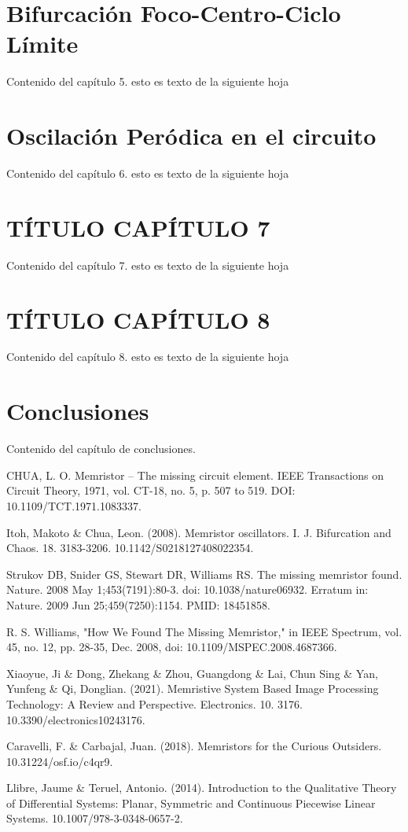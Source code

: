 \documentclass[12pt,a4paper]{report} %
\begin{document}
	\chapter{Bifurcación Foco-Centro-Ciclo Límite}
	Contenido del capítulo 5.
	\newpage
	esto es texto de la siguiente hoja
	
	\chapter{Oscilación Peródica en el circuito}
	Contenido del capítulo 6.
	\newpage
	esto es texto de la siguiente hoja
	
	\chapter{TÍTULO CAPÍTULO 7}
	Contenido del capítulo 7.
	\newpage
	esto es texto de la siguiente hoja
	
	\chapter{TÍTULO CAPÍTULO 8}
	Contenido del capítulo 8.
	\newpage
	esto es texto de la siguiente hoja
	
	\chapter*{Conclusiones}
	Contenido del capítulo de conclusiones.
	\newpage
	
	
	\begin{thebibliography}{99}
		 CHUA, L. O. Memristor – The missing circuit element. IEEE
		Transactions on Circuit Theory, 1971, vol. CT-18, no. 5, p. 507 to
		519. DOI: 10.1109/TCT.1971.1083337.
		
		 Itoh, Makoto \& Chua, Leon. (2008). Memristor oscillators. I. J. Bifurcation and Chaos. 18. 3183-3206. 10.1142/S0218127408022354. 
		
		 Strukov DB, Snider GS, Stewart DR, Williams RS. The missing memristor found. Nature. 2008 May 1;453(7191):80-3. doi: 10.1038/nature06932. Erratum in: Nature. 2009 Jun 25;459(7250):1154. PMID: 18451858.
		
		 R. S. Williams, "How We Found The Missing Memristor," in IEEE Spectrum, vol. 45, no. 12, pp. 28-35, Dec. 2008, doi: 10.1109/MSPEC.2008.4687366.
		
		 Xiaoyue, Ji \& Dong, Zhekang \& Zhou, Guangdong \& Lai, Chun Sing \& Yan, Yunfeng \& Qi, Donglian. (2021). Memristive System Based Image Processing Technology: A Review and Perspective. Electronics. 10. 3176. 10.3390/electronics10243176. 
		
		 Caravelli, F. \& Carbajal, Juan. (2018). Memristors for the Curious Outsiders. 10.31224/osf.io/c4qr9. 
		
		 Llibre, Jaume \& Teruel, Antonio. (2014). Introduction to the Qualitative Theory of Differential Systems: Planar, Symmetric and Continuous Piecewise Linear Systems. 10.1007/978-3-0348-0657-2. 
		
	\end{thebibliography}
	
\end{document}
